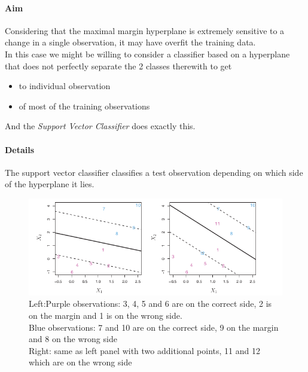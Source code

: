 \paragraph{Aim}
Considering that the maximal margin hyperplane is extremely sensitive
to a change in a single observation, it may have overfit the training
data.\\
In this case we might be willing to consider a classifier based on a
hyperplane that does not perfectly separate the 2 classes therewith to
get 
\begin{itemize}
	\item {} to individual observation
	\item {} of most of the training observations
\end{itemize}
And the \emph{Support Vector Classifier} does exactly this.

\paragraph{Details}
The support vector classifier classifies a test observation depending
on which side of the hyperplane it lies.
\begin{figure}[H]
	\begin{center}
		\includegraphics[width=\textwidth]{./chap/1chap/8sec/images/2supportVectorClassifier.png}
	\end{center}
	\caption{Left:Purple observations: 3, 4, 5 and 6 are on the 
	correct side, 2 is on the margin and 1 is on the wrong side.\\
	Blue observations: 7 and 10 are on the correct side, 9 on the
	margin and 8 on the wrong side\\
	Right: same as left panel with two additional points, 11 and 12
	which are on the wrong side}
	\label{fig:8.1 supportVectorClassifier}
\end{figure}

